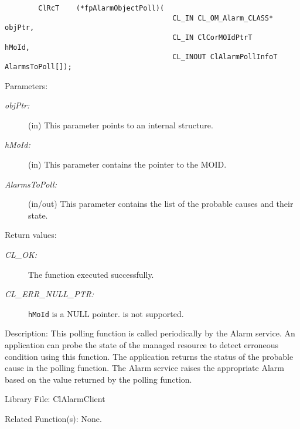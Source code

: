 \begin{flushleft}
\begin{Desc}
\footnotesize\begin{verbatim}        ClRcT    (*fpAlarmObjectPoll)(
                                		CL_IN CL_OM_Alarm_CLASS*   objPtr,
                                		CL_IN ClCorMOIdPtrT        hMoId,
                                		CL_INOUT ClAlarmPollInfoT AlarmsToPoll[]);

\end{verbatim}
\normalsize
\end{Desc}
\begin{Desc}
\item[Parameters:]
\begin{description}
\item[{\em *objPtr:}](in) This parameter points to an internal structure.
\item[{\em hMoId:}](in) This parameter contains the pointer to the MOID.
\item[{\em AlarmsToPoll:}](in/out) This parameter contains the list of the probable causes and their state.
\end{description}
\end{Desc}
\begin{Desc}
\item[Return values:]
\begin{description}
\item[{\em CL\_\-OK:}]The function executed successfully. 
\item[{\em CL\_\-ERR\_\-NULL\_\-PTR:}] {\tt{hMoId}} is a NULL pointer.
is not supported.\end{description}
\end{Desc}
\begin{Desc}
\item[Description:]
This polling function is called periodically by the Alarm service. An application can probe the state of the managed resource to 
detect erroneous condition using this function. The application returns the status of the probable cause in the polling function. The Alarm service
raises the appropriate Alarm based on the value returned by the polling function. 
\end{Desc}
\begin{Desc}
\item[Library File:]Cl\-Alarm\-Client\end{Desc}
\begin{Desc}
\item[Related Function(s):]None. \end{Desc}




\end{flushleft}
